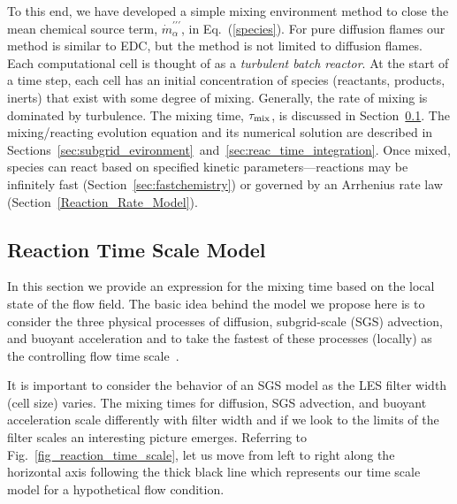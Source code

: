 To this end, we have developed a simple mixing environment method to close the mean chemical source term, $\dot{m}^{\prime\prime\prime}_{\alpha}$, in Eq.~(\ref{species}).  For pure diffusion flames our method is similar to EDC, but the method is not limited to diffusion flames.  Each computational cell is thought of as a {\em turbulent batch reactor}. At the start of a time step, each cell has an initial concentration of species (reactants, products, inerts) that exist with some degree of mixing. Generally, the rate of mixing is dominated by turbulence. The mixing time, $\tau_{\rm mix}$, is discussed in Section~\ref{sec:reac_time_scale}. The mixing/reacting evolution equation and its numerical solution are described in Sections~\ref{sec:subgrid_evironment}~and~\ref{sec:reac_time_integration}. Once mixed, species can react based on specified kinetic parameters---reactions may be infinitely fast (Section~\ref{sec:fastchemistry}) or governed by an Arrhenius rate law (Section~\ref{Reaction_Rate_Model}).


\subsection{Reaction Time Scale Model}
\label{sec:reac_time_scale}

In this section we provide an expression for the mixing time based on the local state of the flow field.  The basic idea behind the model we propose here is to consider the three physical processes of diffusion, subgrid-scale (SGS) advection, and buoyant acceleration and to take the fastest of these processes (locally) as the controlling flow time scale~\cite{McDermott:2011}.

It is important to consider the behavior of an SGS model as the LES filter width (cell size) varies. The mixing times for diffusion, SGS advection, and buoyant acceleration scale differently with filter width and if we look to the limits of the filter scales an interesting picture emerges.  Referring to Fig.~\ref{fig_reaction_time_scale}, let us move from left to right along the horizontal axis following the thick black line which represents our time scale model for a hypothetical flow condition.

